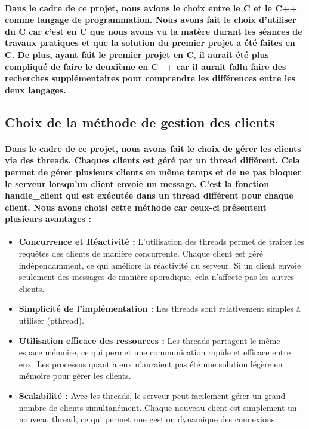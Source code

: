 \documentclass[utf8]{article}
\begin{document}
\paragraph{Dans le cadre de ce projet, nous avions le choix entre le C et le C++ comme langage de programmation.
Nous avons fait le choix d'utiliser du C car c'est en C que nous avons vu la matère durant les séances de travaux 
pratiques et que la solution du premier projet a été faites en C. 
De plus, ayant fait le premier projet en C, il aurait été plus compliqué de faire le deuxième en C++ car il aurait 
fallu faire des recherches supplémentaires pour comprendre les différences entre les deux langages.}

\subsection{Choix de la méthode de gestion des clients}
\paragraph{Dans le cadre de ce projet, nous avons fait le choix de gérer les clients via des threads. Chaques clients est géré par un thread différent.
Cela permet de gérer plusieurs clients en même temps et de ne pas bloquer le serveur lorsqu'un client envoie un message.
C'est la fonction handle\_client qui est exécutée dans un thread différent pour chaque client.
Nous avons choisi cette méthode car ceux-ci présentent plusieurs avantages :}
\begin{itemize}
    \item \textbf{Concurrence et Réactivité :} L'utilisation des threads permet de traiter les requêtes des clients de manière concurrente. Chaque client est géré indépendamment, ce qui améliore la réactivité du serveur. Si un client envoie seulement des messages de manière sporadique, cela n'affecte pas les autres clients.
    \item \textbf{Simplicité de l'implémentation :} Les threads sont relativement simples à utiliser (pthread).
    \item \textbf{Utilisation efficace des ressources :} Les threads partagent le même espace mémoire, ce qui permet une communication rapide et efficace entre eux. Les processus quant a eux n'auraient pas été une solution légère en mémoire pour gérer les clients.
    \item \textbf{Scalabilité :} Avec les threads, le serveur peut facilement gérer un grand nombre de clients simultanément. Chaque nouveau client est simplement un nouveau thread, ce qui permet une gestion dynamique des connexions.
\end{itemize}
\end{document}
